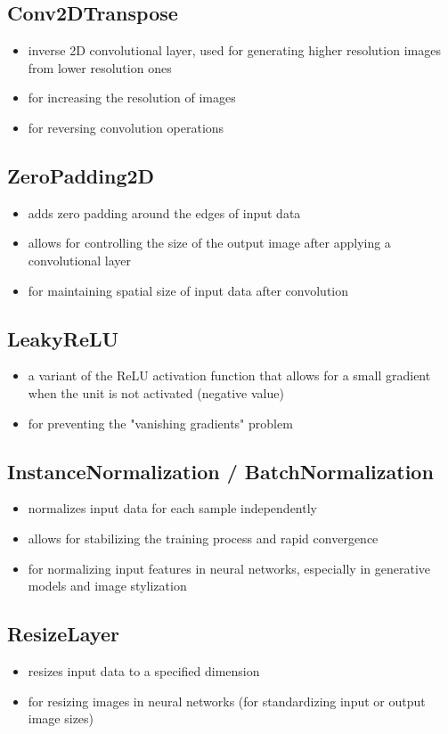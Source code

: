 \documentclass{article}
\begin{document}
\subsection{Conv2DTranspose}
\begin{itemize}
    \item inverse 2D convolutional layer, used for generating higher resolution images from lower resolution ones
    \item for increasing the resolution of images
    \item for reversing convolution operations
\end{itemize}

\subsection{ZeroPadding2D}
\begin{itemize}
    \item adds zero padding around the edges of input data
    \item allows for controlling the size of the output image after applying a convolutional layer
    \item for maintaining spatial size of input data after convolution
\end{itemize}

\subsection{LeakyReLU}
\begin{itemize}
    \item a variant of the ReLU activation function that allows for a small gradient when the unit is not activated (negative value)
    \item for preventing the "vanishing gradients" problem
\end{itemize}

\subsection{InstanceNormalization / BatchNormalization}
\begin{itemize}
    \item normalizes input data for each sample independently
    \item allows for stabilizing the training process and rapid convergence
    \item for normalizing input features in neural networks, especially in generative models and image stylization
\end{itemize}

\subsection{ResizeLayer}
\begin{itemize}
    \item resizes input data to a specified dimension
    \item for resizing images in neural networks (for standardizing input or output image sizes)
\end{itemize}
\end{document}
